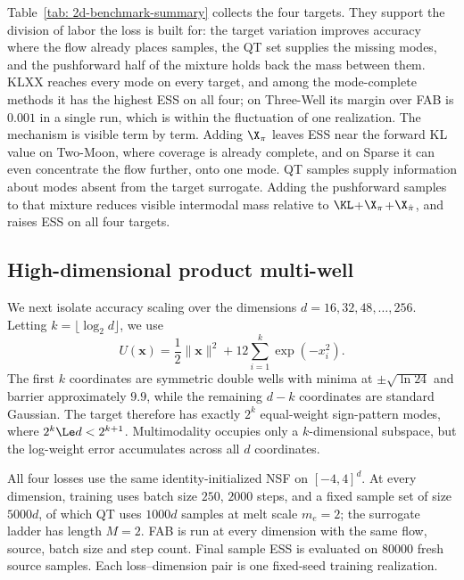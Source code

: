\documentclass{article}
\begin{document}
Table~\ref{tab: 2d-benchmark-summary} collects the four targets. They support the division of labor the loss is built for: the target variation improves accuracy where the flow already places samples, the QT set supplies the missing modes, and the pushforward half of the mixture holds back the mass between them. KLXX reaches every mode on every target, and among the mode-complete methods it has the highest ESS on all four; on Three-Well its margin over FAB is $0.001$ in a single run, which is within the fluctuation of one realization. The mechanism is visible term by term. Adding $\X_\pi$ leaves ESS near the forward KL value on Two-Moon, where coverage is already complete, and on Sparse it can even concentrate the flow further, onto one mode. QT samples supply information about modes absent from the target surrogate. Adding the pushforward samples to that mixture reduces visible intermodal mass relative to $\KL$+$\X_\pi$+$\X_{\hat\pi}$, and raises ESS on all four targets.

\subsection{High-dimensional product multi-well}
\label{subsec: highd}

We next isolate accuracy scaling over the dimensions
$d=16,32,48,\ldots,256$. Letting $k=\lfloor\log_2 d\rfloor$, we use
\begin{equation}
    U(\mathbf{x})=\frac12\lVert\mathbf{x}\rVert^2
    +12\sum_{i=1}^{k}\exp(-x_i^2).
    \label{eq: highd-potential}
\end{equation}
The first $k$ coordinates are symmetric double wells with minima at $\pm\sqrt{\ln 24}$ and barrier approximately $9.9$, while the remaining $d-k$ coordinates are standard Gaussian. The target therefore has exactly $2^k$ equal-weight sign-pattern modes, where $2^k\Le d<2^{k+1}$. Multimodality occupies only a $k$-dimensional subspace, but the log-weight error accumulates across all $d$ coordinates.

All four losses use the same identity-initialized NSF on $[-4,4]^d$. At every dimension, training uses batch size $250$, $2000$ steps, and a fixed sample set of size $5000d$, of which QT uses $1000d$ samples at melt scale $m_e=2$; the surrogate ladder has length $M=2$. FAB is run at every dimension with the same flow, source, batch size and step count. Final sample ESS is evaluated on $80000$ fresh source samples. Each loss--dimension pair is one fixed-seed training realization.
\end{document}

